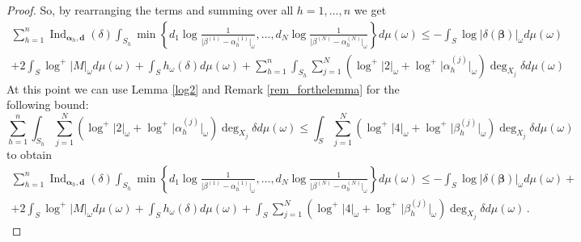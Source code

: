 \documentclass[10 pt,a4paper]{article}
\theoremstyle{plain}
\theoremstyle{definition}
\theoremstyle{named}
\DeclareMathOperator{\Ind}{Ind}
\begin{document}
\begin{proof}
So, by rearranging the terms  and summing over all $h=1,\ldots,n$ we get
\begin{multline}\label{long_ext1}
\sum^n_{h=1}\Ind_{\bm{\alpha}_h, \bm{d}} (\delta)\int_{ S_h}\min\left\{d_1\log\frac{1}{\vert\beta^{(1)}- \alpha_{h}^{(1)}\vert_\omega},\ldots , 
d_N\log\frac{1}{\vert\beta^{(N)}- \alpha_{h}^{(N)}\vert_\omega}\right\}d\mu(\omega)\leq -\int_{ S}\log\vert \delta(\bm{\beta})\vert_\omega d \mu(\omega)\\
+ 2\int_S \log^+\vert M\vert_\omega d\mu(\omega)+\int_{S}h_\omega(\delta) d\mu(\omega) +\sum_{h=1}^n\int_{S_h}\sum_{j=1}^{N}(\log^+\vert 2\vert_\omega+\log^+\vert\alpha_{h}^{(j)} \vert_\omega)\deg_{X_j}\delta d\mu(\omega)
\end{multline}
At this point  we can use Lemma \ref{log2} and Remark \ref{rem_forthelemma} for the following bound:
\begin{equation}\label{lastimachiave}
\sum_{h=1}^n\int_{S_h}\sum_{j=1}^{N}(\log^+\vert 2\vert_\omega+\log^+\vert\alpha_{h}^{(j)} \vert_\omega)\deg_{X_j}\!\!\delta d\mu(\omega)\le \int_{S} \sum_{j=1}^{N}(\log^+\vert 4\vert_\omega+\log^+\vert\beta_{h}^{(j)} \vert_\omega)\deg_{X_j}\!\!\delta d\mu(\omega)\,
\end{equation}
 to obtain
\begin{multline}\label{long_ext1}
\sum^n_{h=1}\Ind_{\bm{\alpha}_h, \bm{d}} (\delta)\int_{ S_h}\min\left\{d_1\log\frac{1}{\vert\beta^{(1)}- \alpha_{h}^{(1)}\vert_\omega},\ldots , 
d_N\log\frac{1}{\vert\beta^{(N)}- \alpha_{h}^{(N)}\vert_\omega}\right\}d\mu(\omega)\leq -\int_{S}\log\vert \delta(\bm\beta)\vert_\omega d \mu(\omega)+\\
+  2\int_S \log^+\vert M\vert_\omega d\mu(\omega)+\int_{ S}h_\omega(\delta) d\mu(\omega)+\int_{ S} \sum_{j=1}^{N}(\log^+\vert 4\vert_\omega+\log^+\vert\beta_{h}^{(j)} \vert_\omega)\deg_{X_j}\!\!\delta d\mu(\omega)\,.
\end{multline}



\end{proof}
\end{document}
